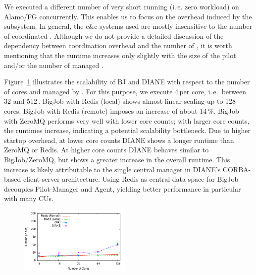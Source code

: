 \documentclass[conference]{IEEEtran}
\begin{document}

We executed a different number of very short running (i.\,e. zero
workload) \cus on Alamo/FG concurrently.  This enables us to focus on
the overhead induced by the \cc subsystem. In general, the c\&c
systems used are mostly insensitive to the number of coordinated \cus.
Although we do not provide a detailed discussion of the dependency
between coordination overhead and the number of \cus, it is worth
mentioning that the runtime increases only slightly with the size of
the pilot and/or the number of managed \cus.


Figure~\ref{fig:perf_bigjob-varying-cores}
illustrates the scalability of BJ and DIANE with respect to the number
of cores and \cus managed by \pilot. For this purpose, we execute
4\,\cus per core, i.\,e.\ between 32 and 512\,\cus.  BigJob with Redis
(local) shows almost linear scaling up to 128 cores. BigJob with Redis
(remote) imposes an increase of about 14\,\%. BigJob with ZeroMQ
performs very well with lower core counts; with larger core counts,
the runtimes increase, indicating a potential scalability
bottleneck. Due to higher startup overhead, at lower core counts DIANE
shows a longer runtime than ZeroMQ or Redis.  At higher core counts
DIANE behaves similar to BigJob/ZeroMQ, but shows a greater increase
in the overall runtime. This increase is likely attributable to the
single central manager in DIANE's CORBA-based client-server
architecture. Using Redis as central data space for BigJob decouples
Pilot-Manager and Agent, yielding better performance in particular
with many CUs. 

\begin{figure}[t] \centering \up\up
\includegraphics[width=0.48\textwidth]{../perf/bigjob-varying-cores-alamo-noadvert.pdf}
\upp \caption{}
\label{fig:perf_bigjob-varying-cores} \end{figure}
\end{document}

